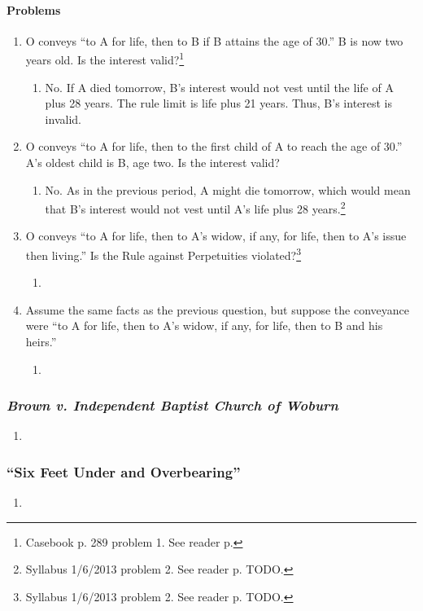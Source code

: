 \paragraph{Problems}

\begin{enumerate}
    \item O conveys ``to A for life, then to B if B attains the age of 30.'' B 
    is now two years old. Is the interest valid?\footnote{Casebook p. 289 
    problem 1. See reader p.}
    \begin{enumerate}
        \item No. If A died tomorrow, B's interest would not vest until the 
        life of A plus 28 years. The rule limit is life plus 21 years. Thus, 
        B's interest is invalid.
    \end{enumerate}
    \item O conveys ``to A for life, then to the first child of A to reach the 
    age of 30.'' A's oldest child is B, age two. Is the interest valid?
    \begin{enumerate}
        \item No. As in the previous period, A might die tomorrow, which would 
        mean that B's interest would not vest until A's life plus 28 
        years.\footnote{Syllabus 1/6/2013 problem 2. See reader p.  TODO.}
    \end{enumerate}
    \item O conveys ``to A for life, then to A's widow, if any, for life, then 
    to A's issue then living.'' Is the Rule against Perpetuities 
    violated?\footnote{Syllabus 1/6/2013 problem 2. See reader p.  TODO.}
    \begin{enumerate}
        \item %
    \end{enumerate}
    \item Assume the same facts as the previous question, but suppose the 
    conveyance were ``to A for life, then to A's widow, if any, for life, then 
    to B and his heirs.''
    \begin{enumerate}
        \item %
    \end{enumerate}
\end{enumerate}

\subsubsection{\emph{Brown v. Independent Baptist Church of Woburn}}

\begin{enumerate}
    \item %
\end{enumerate}

\subsubsection{``Six Feet Under and Overbearing''}
\begin{enumerate}
    \item %
\end{enumerate}


